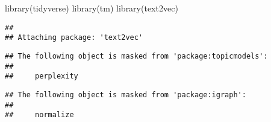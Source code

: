 \documentclass[
]{article}
\newenvironment{Shaded}{\begin{snugshade}}{\end{snugshade}}
\newcommand{\FunctionTok}[1]{\textcolor[rgb]{0.00,0.00,0.00}{#1}}
\newcommand{\NormalTok}[1]{#1}
\begin{document}
\begin{Shaded}
\begin{Highlighting}[]
\FunctionTok{library}\NormalTok{(tidyverse)}
\FunctionTok{library}\NormalTok{(tm)}
\FunctionTok{library}\NormalTok{(text2vec)}
\end{Highlighting}
\end{Shaded}

\begin{verbatim}
## 
## Attaching package: 'text2vec'
\end{verbatim}

\begin{verbatim}
## The following object is masked from 'package:topicmodels':
## 
##     perplexity
\end{verbatim}

\begin{verbatim}
## The following object is masked from 'package:igraph':
## 
##     normalize
\end{verbatim}
\end{document}
